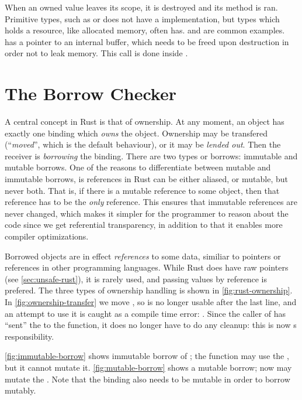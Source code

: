When an owned value leaves its scope, it is destroyed and its  method is ran. Primitive
types, such as  or  does not have a  implementation, but types
which holds a resource, like allocated memory, often has.   and  are
common examples.  has a pointer to an internal buffer, which needs to be freed upon
destruction in order not to leak memory. This  call is done inside .


\section{The Borrow Checker\label{sec:borrow-checker}}

A central concept in Rust is that of ownership. At any moment, an object has exactly one binding
which \emph{owns} the object. Ownership may be transfered (``\emph{moved}'', which is the default
behaviour), or it may be \emph{lended out}. Then the receiver is \emph{borrowing} the binding.
There are two types or borrows: immutable and mutable borrows.
One of the reasons to differentiate between mutable and immutable borrows, is references in Rust
can be either aliased, or mutable, but never both.  That is, if there is a mutable reference to
some object, then that reference has to be the \emph{only} reference. This ensures that immutable
references are never changed, which makes it simpler for the programmer to reason about the code
since we get referential transparency, in addition to that it enables more compiler optimizations.

Borrowed objects are in effect \emph{references} to some data, similiar to pointers or references
in other programming languages. While Rust does have raw pointers (see \cref{sec:unsafe-rust}), it
is rarely used, and passing values by reference is prefered.  The three types of ownership handling
is shown in \cref{fig:rust-ownership}. In \cref{fig:ownership-transfer} we move , so
 is no longer usable after the last line, and an attempt to use it is caught as a compile
time error: . Since the caller of  has
``sent'' the  to the function, it does no longer have to do any cleanup: this is now
s responsibility.

\cref{fig:immutable-borrow} shows immutable borrow of ; the function  may use the
, but it cannot mutate it. \cref{fig:mutable-borrow} shows a mutable borrow; now
 may mutate the . Note that the binding  also needs to be mutable in
order to borrow mutably.

